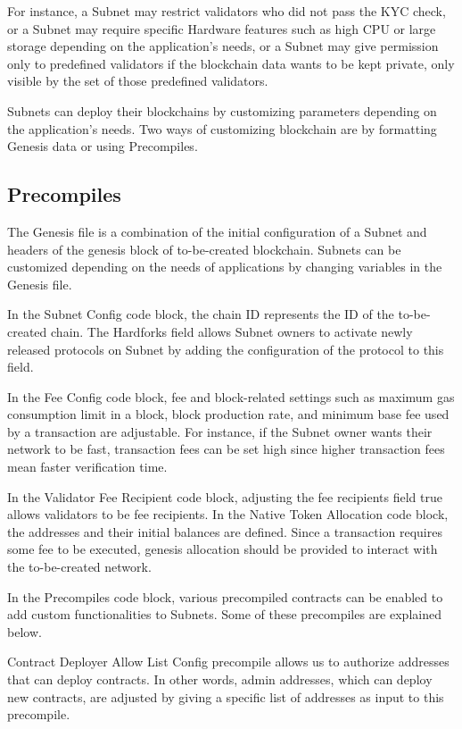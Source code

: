 \documentclass[a4paper,12pt]{report}
\begin{document}
For instance, a Subnet may restrict validators who did not pass the KYC check, or a Subnet may require specific Hardware features such as high CPU or large storage depending on the application's needs, or a Subnet may give permission only to predefined validators if the blockchain data wants to be kept private, only visible by the set of those predefined validators.

Subnets can deploy their blockchains by customizing parameters depending on the application's needs. Two ways of customizing blockchain are by formatting Genesis data or using Precompiles.

\subsection{Precompiles}
The Genesis file is a combination of the initial configuration of a Subnet and headers of the genesis block of to-be-created blockchain. Subnets can be customized depending on the needs of applications by changing variables in the Genesis file. 

In the Subnet Config code block, the chain ID represents the ID of the to-be-created chain. The Hardforks field allows Subnet owners to activate newly released protocols on Subnet by adding the configuration of the protocol to this field.

In the Fee Config code block, fee and block-related settings such as maximum gas consumption limit in a block, block production rate, and minimum base fee used by a transaction are adjustable. For instance, if the Subnet owner wants their network to be fast, transaction fees can be set high since higher transaction fees mean faster verification time.

In the Validator Fee Recipient code block, adjusting the fee recipients field true allows validators to be fee recipients.
In the Native Token Allocation code block, the addresses and their initial balances are defined. Since a transaction requires some fee to be executed, genesis allocation should be provided to interact with the to-be-created network.

In the Precompiles code block, various precompiled contracts can be enabled to add custom functionalities to Subnets. Some of these precompiles are explained below.

Contract Deployer Allow List Config precompile allows us to authorize addresses that can deploy contracts. In other words, admin addresses, which can deploy new contracts, are adjusted by giving a specific list of addresses as input to this precompile. 
\end{document}
